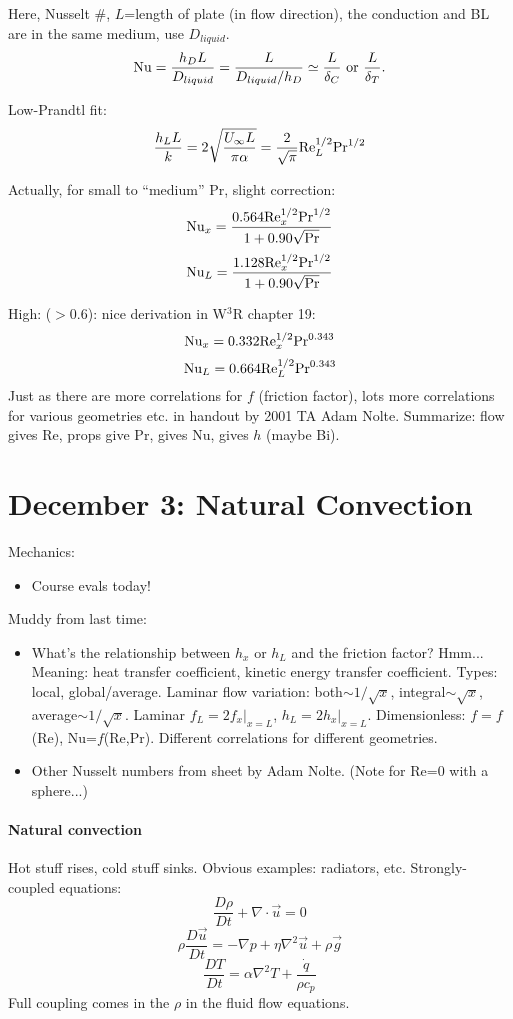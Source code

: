 \documentclass{report}
\begin{document}
Here, Nusselt \#, $L$=length of plate (in flow direction), the conduction and
BL are in the same medium, use $D_{liquid}$.
$${\rm Nu} = \frac{h_D L}{D_{liquid}} = \frac{L}{D_{liquid}/h_D} \simeq
\frac{L}{\delta_C}\ {\rm or}\ \frac{L}{\delta_T}.$$

Low-Prandtl fit:
$$\frac{h_L L}{k} = 2\sqrt{\frac{U_\infty L}{\pi\alpha}} =
\frac{2}{\sqrt{\pi}} {\rm Re}_L^{1/2}{\rm Pr}^{1/2}$$

Actually, for small to ``medium'' Pr, slight correction:
$${\rm Nu}_x =
\frac{0.564{\rm Re}_x^{1/2}{\rm Pr}^{1/2}}{1+0.90\sqrt{\rm Pr}}$$
$${\rm Nu}_L =
\frac{1.128{\rm Re}_x^{1/2}{\rm Pr}^{1/2}}{1+0.90\sqrt{\rm Pr}}$$

High: ($>$0.6): nice derivation in W$^3$R chapter 19:
$${\rm Nu}_x = 0.332{\rm Re}_x^{1/2} {\rm Pr}^{0.343}$$
$${\rm Nu}_L = 0.664{\rm Re}_L^{1/2} {\rm Pr}^{0.343}$$
Just as there are more correlations for $f$ (friction factor), lots more
correlations for various geometries etc. in handout by 2001 TA Adam Nolte.
Summarize: flow gives Re, props give Pr, gives Nu, gives $h$ (maybe Bi).
\newpage


\section{December 3: Natural Convection}

Mechanics:
\begin{itemize}
\item Course evals today!
\end{itemize}
Muddy from last time:
\begin{itemize}
\item What's the relationship between $h_x$ or $h_L$ and the friction factor?
  Hmm...  Meaning: heat transfer coefficient, kinetic energy transfer
  coefficient.  Types: local, global/average.  Laminar flow variation:
  both$\sim1/\sqrt{x}$, integral$\sim\sqrt{x}$, average$\sim1/\sqrt{x}$.
  Laminar $f_L=2f_x|_{x=L}$, $h_L=2h_x|_{x=L}$.  Dimensionless: $f=f$(Re),
  Nu=$f$(Re,Pr). Different correlations for different geometries.
\item Other Nusselt numbers from sheet by Adam Nolte.  (Note for Re=0 with a
  sphere...)
\end{itemize}

\paragraph{Natural convection}

Hot stuff rises, cold stuff sinks.  Obvious examples: radiators, etc.
Strongly-coupled equations:
$$\frac{D\rho}{Dt} + \nabla\cdot\vec{u} = 0$$
$$\rho\frac{D\vec{u}}{Dt} = -\nabla p + \eta\nabla^2\vec{u} + \rho\vec{g}$$
$$\frac{DT}{Dt} = \alpha\nabla^2 T + \frac{\dot{q}}{\rho c_p}$$
Full coupling comes in the $\rho$ in the fluid flow equations.
\end{document}
